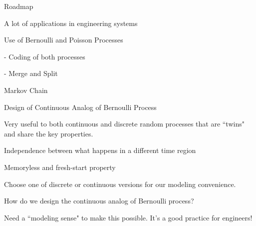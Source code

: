 \documentclass[fleqn,aspectratio=169]{beamer}
\begin{document}
\begin{frame}{Roadmap}

\plitemsep 0.1in

\bci 
\item A lot of applications in engineering systems


\bigskip

\item {}

\medskip
\item {}
\item {}
\item Use of Bernoulli and Poisson Processes

- Coding of both processes

- Merge and Split

\medskip
\item Markov Chain

\eci 

\end{frame}


\begin{frame}{Design of Continuous Analog of Bernoulli Process}

\plitemsep 0.15in
\bci
\item<1-> Very useful to both continuous and discrete random processes that are ``twins" and share the key properties.

\bci
\item<2-> Independence between what happens in a different time region

\item<3-> Memoryless and fresh-start property
\eci

\item<4-> Choose one of discrete or continuous versions for our modeling convenience.

\item<5->  How do we design the continuous analog of Bernoulli process?


\item<8-> Need a ``modeling sense" to make this possible. It's a good practice for engineers!
\eci
\end{frame}
\end{document}
